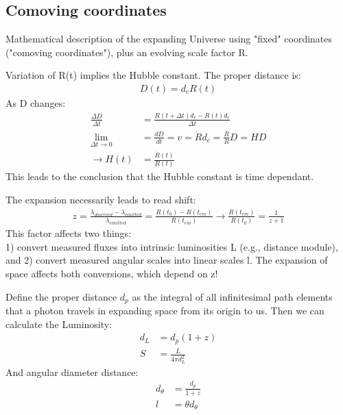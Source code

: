 \documentclass[11pt,a4paper]{article}
\begin{document}
\subsection{Comoving coordinates}
Mathematical description of the expanding Universe using
"fixed" coordinates ("comoving coordinates"), plus an evolving scale factor R.

Variation of R(t) implies the Hubble constant.
The proper distance is:
\begin{align*}
   D(t) = d_c R(t) 
\end{align*}
As D changes:
\begin{align*}
    \frac {\Delta D}{\Delta t} &=  \frac {R(t + \Delta t)d_c -R(t)d_c}{\Delta t} \\
    \lim_{\Delta t \rightarrow 0} &= \frac {dD}{dt} = v = \dot R d_c = \frac {\dot R} R D = HD \\ 
    \rightarrow H(t) &= \frac {\dot R(t)}{R(t)}
\end{align*}
This leads to the conclusion that the Hubble constant is time dependant. 

The expansion necessarily leads to read shift:
\begin{align*}
    z = \frac {\lambda_{observed} - \lambda_{emitted} } { \lambda_{emitted}} = \frac {R(t_0) - R(t_{em})}{R(t_{em})} \rightarrow \frac { R(t_{em})}{R(t_0)} = \frac 1 {z+1}
\end{align*}
This factor affects two things:  \\
1) convert measured fluxes into intrinsic luminosities L (e.g., distance module), and 2) convert measured angular
scales into linear scales l. The expansion of space affects both conversions, which depend on z!

Define the proper distance $d_p$ as the integral of all infinitesimal path elements
that a photon travels in expanding space from its origin to us.
Then we can calculate the Luminosity: 
\begin{align*}
    d_L &= d_p (1+z) \\ 
    S &= \frac L {4 \pi d_L^2}
\end{align*}
And angular diameter distance:
\begin{align*}
    d_\theta &= \frac {d_p}{1+z} \\ 
    l &= \theta d_\theta
\end{align*}
\end{document}
